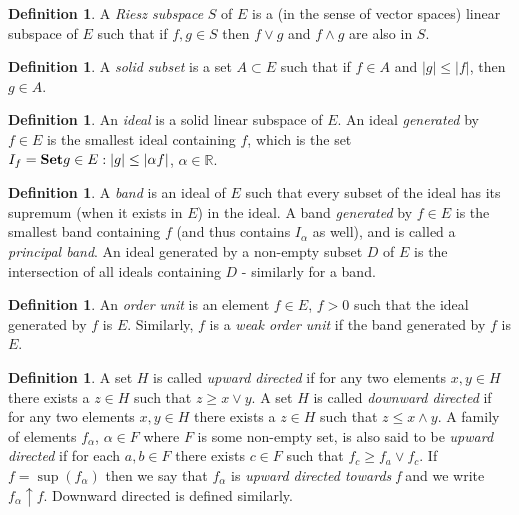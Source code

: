 \documentclass[letterpaper,10pt,oneside,onecolumn,reqno]{amsart}
\newcommand{\R}{\mathbb R}
\theoremstyle{definition}
\newtheorem{defn}[thm]{Definition}
\newcommand{\catname}[1]{{\normalfont\textbf{#1}}}
\newcommand{\Set}{\catname{Set}}
\newcommand{\meet}{\wedge}
\newcommand{\join}{\vee}
\begin{document}
\begin{defn}\label{def:8}
A \emph{Riesz subspace} $S$ of $E$ is a (in the sense of vector spaces) linear subspace of $E$ such that if $f,g \in S$ then $f \join g$ and $f \meet g$ are also in $S$.
\end{defn}

\begin{defn}\label{def:9}
 A \emph{solid subset} is a set $A \subset E$ such that if $f \in A$ and $|g| \leq |f|$, then $g \in A$.
\end{defn}

\begin{defn}\label{def:10}
An \emph{ideal} is a solid linear subspace of $E$. An ideal \emph{generated} by $f\in E$ is the smallest ideal containing $f$, which is the set $I_{f} = \Set{g \in E: |g| \leq |\alpha f|}$, $\alpha \in \R$. 
\end{defn}

\begin{defn}\label{def:11}
A \emph{band} is an ideal of $E$ such that every subset of the ideal has its supremum (when it exists in $E$) in the ideal. A band \emph{generated} by $f\in E$ is the smallest band containing $f$ (and thus contains $I_{\alpha}$ as well), and is called a \emph{principal band}. An ideal generated by a non-empty subset $D$ of $E$ is the intersection of all ideals containing $D$ - similarly for a band.
\end{defn}

\begin{defn}\label{def:12}
An \emph{order unit} is an element $f \in E$, $f > 0$ such that the ideal generated by $f$ is $E$. Similarly, $f$ is a \emph{weak order unit} if the band generated by $f$ is $E$.
\end{defn}


\begin{defn}\label{def:13}
A set $H$ is called \emph{upward directed} if for any two elements $x,y \in H$ there exists a $z \in H$ such that $z \geq x \join y$. A set $H$ is called \emph{downward directed} if for any two elements $x,y \in H$ there exists a $z \in H$ such that $z \leq x \meet y$. A family of elements $f_{\alpha}$, $\alpha \in F$ where $F$ is some non-empty set, is also said to be \emph{upward directed} if for each $a,b \in F$ there exists $c \in F$ such that $f_c \geq f_a \join f_c$. If $f = \sup({f_\alpha})$ then we say that $f_{\alpha}$ is \emph{upward directed towards f} and we write $f_{\alpha}\uparrow f$. Downward directed is defined similarly. 
\end{defn}
\end{document}
